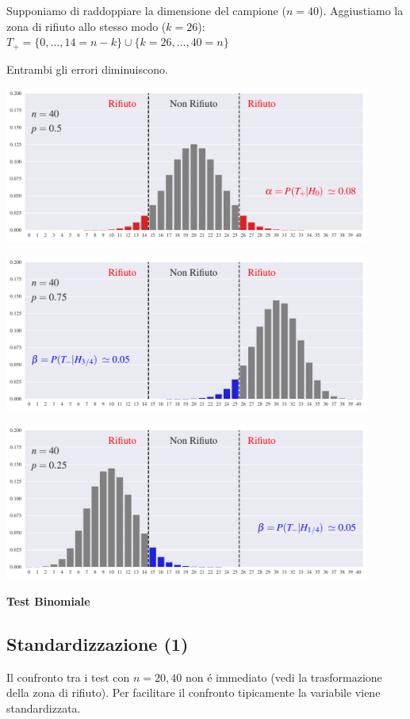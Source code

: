 \documentclass[12pt,openany]{book}
\theoremstyle{mio}
\theoremstyle{liscio}
\begin{document}
Supponiamo di raddoppiare la dimensione del campione ($n=40$). Aggiustiamo la zona di rifiuto allo stesso modo ($k=26$):  $T_+=\{0,\dots,14=n-k\}\cup \{k=26,\dots,40=n\}$

Entrambi gli errori diminuiscono.


\hfil\includegraphics[width=0.9\textwidth]{figure/B-test_07.pdf}

\hfil\includegraphics[width=0.9\textwidth]{figure/B-test_08.pdf}

\hfil\includegraphics[width=0.9\textwidth]{figure/B-test_09.pdf}




\clearpage\hfill\textbf{Test Binomiale}
\subsection{Standardizzazione (1)}

Il confronto tra i test con $n=20, 40$ non é immediato (vedi la trasformazione della zona di rifiuto). Per facilitare il confronto tipicamente la variabile viene standardizzata. 
\end{document}
